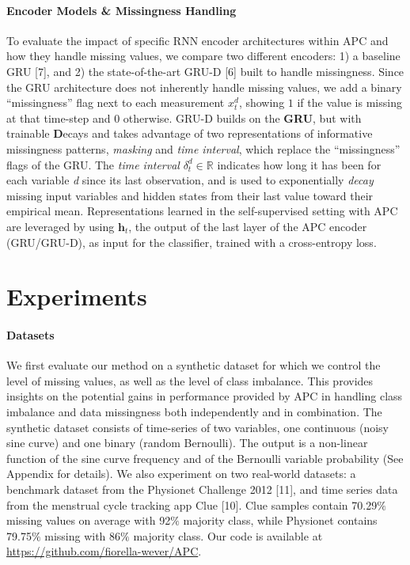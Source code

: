 \documentclass{article}
\begin{document}
\paragraph{Encoder Models \& Missingness Handling}
To evaluate the impact of specific RNN encoder architectures within APC and how they handle missing values, we
compare two different encoders: 1) a baseline GRU
[7], 
and 2) the state-of-the-art GRU-D [6]
built to handle missingness. Since the GRU architecture does not inherently handle missing values, we add a binary ``missingness'' flag next to each measurement $x_{t}^{d}$, showing $1$ if the value is missing at that time-step and $0$ otherwise. 
GRU-D builds on the \textbf{GRU}, but with trainable \textbf{D}ecays and takes advantage of two representations of informative missingness patterns, \textit{masking} and \textit{time interval}, which replace the ``missingness'' flags of the GRU.
The \textit{time interval} $\delta_{t}^{d} \in \mathbb{R}$ indicates how long it has been for each variable \textit{d} since its last observation, and is used to exponentially \textit{decay} missing input variables and hidden states from their last value toward their empirical mean.
Representations learned in the self-supervised setting with APC are leveraged by using $\textbf{h}_t$, the output of the last layer of the APC encoder (GRU/GRU-D), as input for the classifier, trained with a cross-entropy loss.

\section{Experiments}


\paragraph{Datasets} We first evaluate our method on a synthetic dataset for which we control the level of missing values, as well as the level of class imbalance. This provides insights on the potential gains in performance provided by APC in handling class imbalance and data missingness both independently and in combination. The synthetic dataset consists of time-series of two variables, one continuous (noisy sine curve) and one binary (random Bernoulli). The output is a non-linear function of the sine curve frequency and of the Bernoulli variable probability (See Appendix for details).
We also experiment on two real-world datasets: a benchmark dataset from the Physionet Challenge 2012 [11], and time series data from the menstrual cycle tracking app Clue [10]. 
Clue samples contain 70.29$\%$ missing values on average with 92$\%$ majority class, while Physionet contains 79.75$\%$ missing with 86$\%$ majority class. 
Our code is available at \url{https://github.com/fiorella-wever/APC}.
\end{document}
